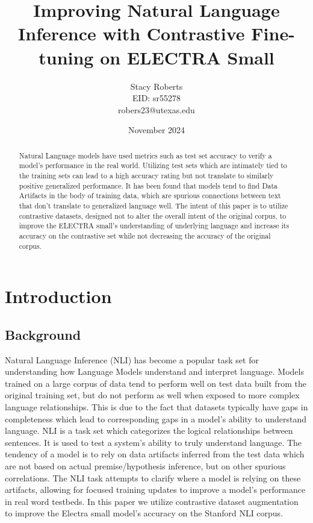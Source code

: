 \documentclass[11pt]{article}
\title{Improving Natural Language Inference with Contrastive Fine-tuning on ELECTRA Small}
\author{Stacy Roberts \\ EID: sr55278 \\robers23@utexas.edu}
\date{November 2024}
\begin{document}
\maketitle
\begin{abstract}
Natural Language models have used metrics such as test set accuracy to verify a model's performance in the real world. Utilizing test sets which are intimately tied to the training sets can lead to a high accuracy rating but not translate to similarly positive generalized performance. It has been found that models tend to find Data Artifacts in the body of training data, which are spurious connections between text that don't translate to generalized language well. The intent of this paper is to utilize contrastive datasets, designed not to alter the overall intent of the original corpus, to improve the ELECTRA small's understanding of underlying language and increase its accuracy on the contrastive set while not decreasing the accuracy of the original corpus.
\end{abstract}

\section{Introduction}
\subsection{Background}
Natural Language Inference (NLI) has become a popular task set for understanding how Language Models understand and interpret language. Models trained on a large corpus of data tend to perform well on test data built from the original training set, but do not perform as well when exposed to more complex language relationships. This is due to the fact that datasets typically have gaps in completeness which lead to corresponding gaps in a model's ability to understand language. NLI is a task set which categorizes the logical relationships between sentences.  It is used to test a system's ability to truly understand language. The tendency of a model is to rely on data artifacts inferred from the test data which are not based on actual premise/hypothesis inference, but on other spurious correlations. The NLI task attempts to clarify where a model is relying on these artifacts, allowing for focused training updates to improve a model's performance in real word testbeds. In this paper we utilize contrastive dataset augmentation to improve the Electra small model's accuracy on the Stanford NLI corpus.
\end{document}
